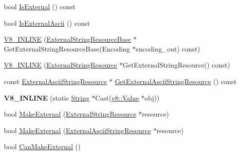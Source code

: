 \begin{DoxyCompactItemize}
\item 
bool \hyperlink{classv8_1_1_string_abbf623aabba9446cd57af14018877398}{Is\+External} () const 
\item 
bool \hyperlink{classv8_1_1_string_a470adeefeeb419860d4e069714fed42e}{Is\+External\+Ascii} () const 
\item 
\hyperlink{classv8_1_1_string_a2b70801681e8bb4cd729bb77321cc028}{V8\+\_\+\+I\+N\+L\+I\+N\+E} (\hyperlink{classv8_1_1_string_1_1_external_string_resource_base}{External\+String\+Resource\+Base} $\ast$Get\+External\+String\+Resource\+Base(Encoding $\ast$encoding\+\_\+out) const)
\item 
\hyperlink{classv8_1_1_string_a6cd3d1a90d42fbfbd723223995018447}{V8\+\_\+\+I\+N\+L\+I\+N\+E} (\hyperlink{classv8_1_1_string_1_1_external_string_resource}{External\+String\+Resource} $\ast$Get\+External\+String\+Resource() const)
\item 
const \hyperlink{classv8_1_1_string_1_1_external_ascii_string_resource}{External\+Ascii\+String\+Resource} $\ast$ \hyperlink{classv8_1_1_string_a1e6b2d33868b12e3b8fc4553b8b11d24}{Get\+External\+Ascii\+String\+Resource} () const 
\item 
\hypertarget{classv8_1_1_string_ae390706e61681df20ea8607e44e35e0f}{}{\bfseries V8\+\_\+\+I\+N\+L\+I\+N\+E} (static \hyperlink{classv8_1_1_string}{String} $\ast$Cast(\hyperlink{classv8_1_1_value}{v8\+::\+Value} $\ast$obj))\label{classv8_1_1_string_ae390706e61681df20ea8607e44e35e0f}

\item 
bool \hyperlink{classv8_1_1_string_a5efd1eba40c1fa8a6aae2c4a175a63be}{Make\+External} (\hyperlink{classv8_1_1_string_1_1_external_string_resource}{External\+String\+Resource} $\ast$resource)
\item 
bool \hyperlink{classv8_1_1_string_a19db11c97e2ce01244e06f5cbcd094f2}{Make\+External} (\hyperlink{classv8_1_1_string_1_1_external_ascii_string_resource}{External\+Ascii\+String\+Resource} $\ast$resource)
\item 
bool \hyperlink{classv8_1_1_string_a0fe076838af046506ffebbfadcde812a}{Can\+Make\+External} ()
\end{DoxyCompactItemize}
